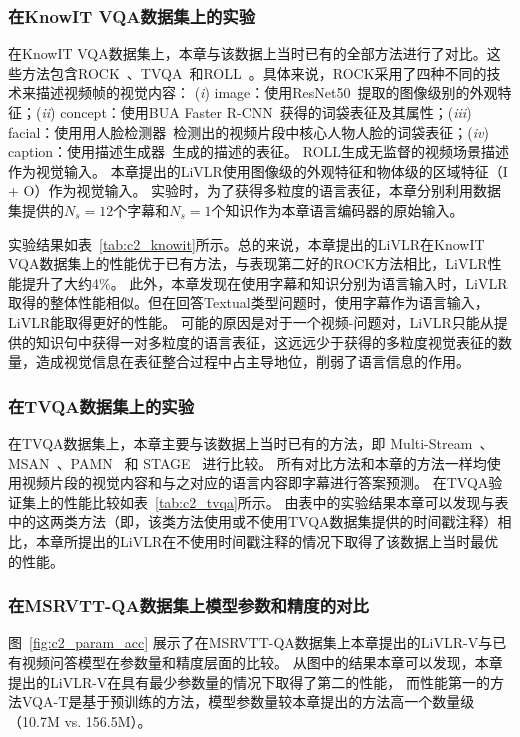 \subsubsection{在KnowIT VQA数据集上的实验}
在KnowIT VQA数据集上，本章与该数据上当时已有的全部方法进行了对比。这些方法包含ROCK~\cite{garcia2020knowit}、TVQA~\cite{lei2018tvqa}和ROLL~\cite{garcia2020knowledge}。具体来说，ROCK采用了四种不同的技术来描述视频帧的视觉内容：
(\emph{i}) image：使用ResNet50~\cite{he2016deep}提取的图像级别的外观特征；(\emph{ii}) concept：使用BUA Faster R-CNN~\cite{anderson2018bottom}获得的词袋表征及其属性；(\emph{iii}) facial：使用用人脸检测器~\cite{parkhi2015deep}检测出的视频片段中核心人物人脸的词袋表征；(\emph{iv}) caption：使用描述生成器~\cite{xu2015show}生成的描述的表征。
ROLL生成无监督的视频场景描述作为视觉输入。
本章提出的LiVLR使用图像级的外观特征和物体级的区域特征（I + O）作为视觉输入。
实验时，为了获得多粒度的语言表征，本章分别利用数据集提供的$N_s=12$个字幕和$N_s=1$个知识作为本章语言编码器的原始输入。

实验结果如表~\ref{tab:c2_knowit}所示。总的来说，本章提出的LiVLR在KnowIT VQA数据集上的性能优于已有方法，与表现第二好的ROCK方法相比，LiVLR性能提升了大约4\%。
此外，本章发现在使用字幕和知识分别为语言输入时，LiVLR取得的整体性能相似。但在回答Textual类型问题时，使用字幕作为语言输入，LiVLR能取得更好的性能。
可能的原因是对于一个视频-问题对，LiVLR只能从提供的知识句中获得一对多粒度的语言表征，这远远少于获得的多粒度视觉表征的数量，造成视觉信息在表征整合过程中占主导地位，削弱了语言信息的作用。

 


\subsubsection{在TVQA数据集上的实验}
在TVQA数据集上，本章主要与该数据上当时已有的方法，即 Multi-Stream~\cite{lei2018tvqa}、MSAN~\cite{kim2020modality}、PAMN~\cite{kim2019progressive} 和 STAGE~\cite{lei2020tvqa} 进行比较。
所有对比方法和本章的方法一样均使用视频片段的视觉内容和与之对应的语言内容即字幕进行答案预测。
在TVQA验证集上的性能比较如表~\ref{tab:c2_tvqa}所示。
由表中的实验结果本章可以发现与表中的这两类方法（即，该类方法使用或不使用TVQA数据集提供的时间戳注释）相比，本章所提出的LiVLR在不使用时间戳注释的情况下取得了该数据上当时最优的性能。

 


\subsubsection{在MSRVTT-QA数据集上模型参数和精度的对比}
图~\ref{fig:c2_param_acc} 展示了在MSRVTT-QA数据集上本章提出的LiVLR-V与已有视频问答模型在参数量和精度层面的比较。
从图中的结果本章可以发现，本章提出的LiVLR-V在具有最少参数量的情况下取得了第二的性能，
而性能第一的方法VQA-T是基于预训练的方法，模型参数量较本章提出的方法高一个数量级（10.7M vs. 156.5M）。



